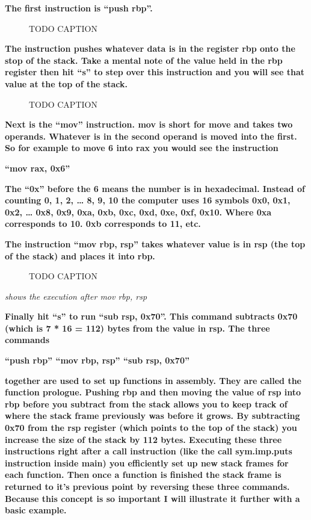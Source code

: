 \documentclass[letterpaper]{article}
\newcommand{\sitfig}[3]{
\begin{figure}[H]
\centering
\makebox[\textwidth][c]{
#2
}
\caption{#3}
\label{#1}
\end{figure}
}
\newcommand{\sitgfx}[4][scale=1.0]{
\sitfig{#3}{\texttt{[image: \#2]}}{#4}
}
\begin{document}
\textbf{The first instruction is ``push rbp''.}

  
\sitgfx[width=5.8335in,height=0.7035in]{FINALWORKINGDOCFORMERLYPRECURSOR-img086.png}{fig:unk}{TODO CAPTION}
 

\textbf{The instruction pushes whatever data is in the register rbp onto the stop of the stack. Take a mental note of
the value held in the rbp register then hit ``s'' to step over this instruction and you will see that value at the top
of the stack.}

  
\sitgfx[width=5.8335in,height=3.6457in]{FINALWORKINGDOCFORMERLYPRECURSOR-img087.png}{fig:unk}{TODO CAPTION}
 

\textbf{Next is the ``mov'' instruction. mov is short for move and takes two operands. Whatever is in the second operand
is moved into the first. So for example to move 6 into rax you would see the instruction}

\textbf{{}``mov rax, 0x6''}

\textbf{The ``0x'' before the 6 means the number is in hexadecimal. Instead of counting 0, 1, 2, {\dots} 8, 9, 10 the
computer uses 16 symbols 0x0, 0x1, 0x2, {\dots} 0x8, 0x9, 0xa, 0xb, 0xc, 0xd, 0xe, 0xf, 0x10. Where 0xa corresponds to
10. 0xb corresponds to 11, etc.}

\textbf{The instruction ``mov rbp, rsp'' takes whatever value is in rsp (the top of the stack) and places it into rbp.}

  
\sitgfx[width=5.8335in,height=3.6457in]{FINALWORKINGDOCFORMERLYPRECURSOR-img088.png}{fig:unk}{TODO CAPTION}
 

\textit{shows the execution after mov rbp, rsp}

\textbf{Finally hit ``s'' to run ``sub rsp, 0x70''. This command subtracts 0x70 (which is 7 * 16 = 112) bytes from the
value in rsp. The three commands}

\textbf{{}``push rbp''\newline
{}``mov rbp, rsp''\newline
{}``sub rsp, 0x70''}

\textbf{together are used to set up functions in assembly. They are called the function prologue. Pushing rbp and then
moving the value of rsp into rbp before you subtract from the stack allows you to keep track of where the stack frame
previously was before it grows. By subtracting 0x70 from the rsp register (which points to the top of the stack) you
increase the size of the stack by 112 bytes. Executing these three instructions right after a call instruction (like
the call sym.imp.puts instruction inside main) you efficiently set up new stack frames for each function. Then once a
function is finished the stack frame is returned to it's previous point by reversing these three commands. Because this
concept is so important I will illustrate it further with a basic example.}
\end{document}
